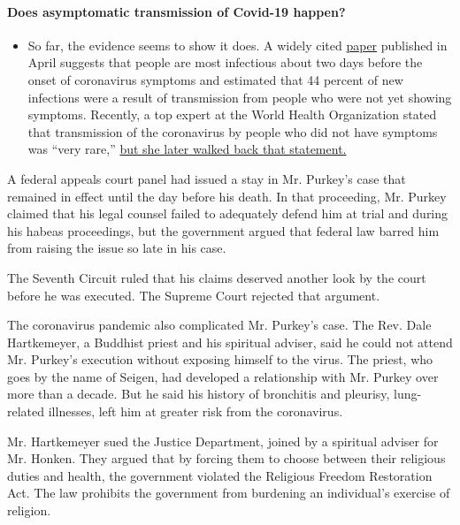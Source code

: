 \begin{itemize}
{  \paragraph{Does asymptomatic transmission of Covid-19
  happen?}\label{does-asymptomatic-transmission-of-covid-19-happen}}

  \begin{itemize}
  \tightlist
  \item
    So far, the evidence seems to show it does. A widely cited
    \href{https://www.nature.com/articles/s41591-020-0869-5}{paper}
    published in April suggests that people are most infectious about
    two days before the onset of coronavirus symptoms and estimated that
    44 percent of new infections were a result of transmission from
    people who were not yet showing symptoms. Recently, a top expert at
    the World Health Organization stated that transmission of the
    coronavirus by people who did not have symptoms was ``very rare,''
    \href{https://www.nytimes.com/2020/06/09/world/coronavirus-updates.html?action=click\&pgtype=Article\&state=default\&region=MAIN_CONTENT_3\&context=storylines_faq\#link-1f302e21}{but
    she later walked back that statement.}
  \end{itemize}
\end{itemize}

A federal appeals court panel had issued a stay in Mr. Purkey's case
that remained in effect until the day before his death. In that
proceeding, Mr. Purkey claimed that his legal counsel failed to
adequately defend him at trial and during his habeas proceedings, but
the government argued that federal law barred him from raising the issue
so late in his case.

The Seventh Circuit ruled that his claims deserved another look by the
court before he was executed. The Supreme Court rejected that argument.

The coronavirus pandemic also complicated Mr. Purkey's case. The Rev.
Dale Hartkemeyer, a Buddhist priest and his spiritual adviser, said he
could not attend Mr. Purkey's execution without exposing himself to the
virus. The priest, who goes by the name of Seigen, had developed a
relationship with Mr. Purkey over more than a decade. But he said his
history of bronchitis and pleurisy, lung-related illnesses, left him at
greater risk from the coronavirus.

Mr. Hartkemeyer sued the Justice Department, joined by a spiritual
adviser for Mr. Honken. They argued that by forcing them to choose
between their religious duties and health, the government violated the
Religious Freedom Restoration Act. The law prohibits the government from
burdening an individual's exercise of religion.

